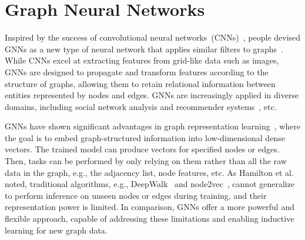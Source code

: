 

\section{Graph Neural Networks}
\label{sec:bg_gnn}
Inspired by the success of convolutional neural networks~(CNNs)~\cite{CNN0}, people devised GNNs as a new type of neural network that applies similar filters to graphs~\cite{lecunGCN, hamilton2017inductive, Pinterest, GCNPierre, kipf2016semi, kipf2016variational, pmlr-v48-niepert16}.
While CNNs excel at extracting features from grid-like data such as images, GNNs are designed to propagate and transform features according to the structure of graphs, allowing them to retain relational information between entities represented by nodes and edges.
GNNs are increasingly applied in diverse domains, including social network analysis and recommender systems~\cite{hamilton2017inductive,Pinterest,kipf2016semi}, etc.


GNNs have shown significant advantages in graph representation learning~\cite{HamiltonYL17, hamilton2017inductive, Pinterest}, where the goal is to embed graph-structured information into low-dimensional dense vectors.
The trained model can produce vectors for specified nodes or edges. Then, tasks can be performed by only relying on them rather than all the raw data in the graph, e.g., the adjacency list, node features, etc. 
As Hamilton et al.\ \cite{HamiltonYL17} noted, traditional algorithms, e.g., DeepWalk~\cite{DeepWalk} and node2vec~\cite{node2vec}, cannot generalize to perform inference on unseen nodes or edges during training, and their representation power is limited.
In comparison, GNNs offer a more powerful and flexible approach, capable of addressing these limitations and enabling inductive learning for new graph data.


